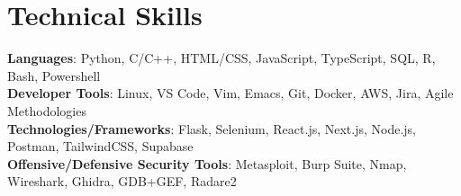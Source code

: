 \documentclass[letterpaper,11pt]{article}
\newcommand{\resumeSubHeadingListStart}{\begin{itemize}[leftmargin=0.0in, label={}]}
\newcommand{\resumeSubHeadingListEnd}{\end{itemize}}
\begin{document}
\begin{comment}
\section{Relevant Coursework}
        \begin{multicols}{4}
            \begin{itemize}[itemsep=-5pt, parsep=3pt]
                \item\small Data Structures
                \item Software Methodology
                \item Algorithms Analysis
                \item Database Management
                \item Artificial Intelligence
                \item Internet Technology
                \item Systems Programming
                \item Computer Architecture
            \end{itemize}
        \end{multicols}
        \vspace*{2.0\multicolsep}
\end{comment}

\section{Technical Skills}
 \begin{itemize}[leftmargin=0.15in, label={}]
    \small{\item{
     \textbf{Languages}{: Python, C/C++, HTML/CSS, JavaScript, TypeScript, SQL, R, Bash, Powershell} \\
     \textbf{Developer Tools}{: Linux, VS Code, Vim, Emacs, Git, Docker, AWS, Jira, Agile Methodologies} \\
     \textbf{Technologies/Frameworks}{: Flask, Selenium, React.js, Next.js, Node.js, Postman, TailwindCSS, Supabase} \\
    \textbf{Offensive/Defensive Security Tools}{: Metasploit, Burp Suite, Nmap, Wireshark, Ghidra, GDB+GEF, Radare2} \\
    }}
 \end{itemize}
 \vspace{-16pt}
\end{document}
